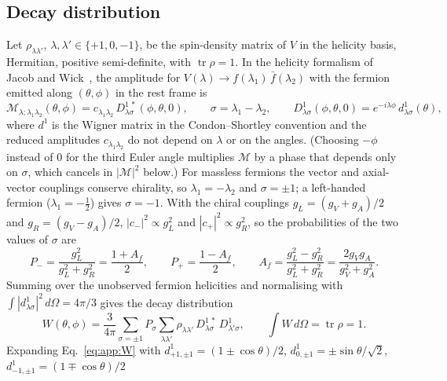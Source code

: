 \subsection{Decay distribution}
\label{app:truth:decay}
Let $\rho_{\lambda\lambda'}$, $\lambda,\lambda' \in \{+1, 0, -1\}$, be the spin-density matrix of $V$ in the helicity
basis, Hermitian, positive semi-definite, with $\operatorname{tr}\rho = 1$. In the helicity formalism of Jacob and
Wick~\cite{Jacob:1959at}, the amplitude for $V(\lambda) \to f(\lambda_1)\,\bar f(\lambda_2)$ with the fermion emitted
along $(\theta,\phi)$ in the rest frame is
\begin{equation}
  \mathcal{M}_{\lambda;\lambda_1\lambda_2}(\theta,\phi) = c_{\lambda_1\lambda_2}\, D^{1\,*}_{\lambda\sigma}(\phi,\theta,0),
  \qquad \sigma = \lambda_1 - \lambda_2,
  \qquad D^{1}_{\lambda\sigma}(\phi,\theta,0) = e^{-i\lambda\phi}\, d^{1}_{\lambda\sigma}(\theta),
  \label{eq:app:amp}
\end{equation}
where $d^1$ is the Wigner matrix in the Condon--Shortley convention and the reduced amplitudes $c_{\lambda_1\lambda_2}$
do not depend on $\lambda$ or on the angles. (Choosing $-\phi$ instead of $0$ for the third Euler angle multiplies
$\mathcal M$ by a phase that depends only on $\sigma$, which cancels in $|\mathcal M|^2$ below.) For massless fermions
the vector and axial-vector couplings conserve chirality, so $\lambda_1 = -\lambda_2$ and $\sigma = \pm1$; a
left-handed fermion ($\lambda_1 = -\tfrac12$) gives $\sigma = -1$. With the chiral couplings
$g_L = (g_V + g_A)/2$ and $g_R = (g_V - g_A)/2$, $|c_{-}|^2 \propto g_L^2$ and $|c_{+}|^2 \propto g_R^2$, so the
probabilities of the two values of $\sigma$ are
\begin{equation}
  P_{-} = \frac{g_L^2}{g_L^2 + g_R^2} = \frac{1 + A_f}{2}, \qquad P_{+} = \frac{1 - A_f}{2}, \qquad
  A_f = \frac{g_L^2 - g_R^2}{g_L^2 + g_R^2} = \frac{2 g_V g_A}{g_V^2 + g_A^2}.
  \label{eq:app:Af}
\end{equation}
Summing over the unobserved fermion helicities and normalising with $\int |d^1_{\lambda\sigma}|^2 \,d\Omega = 4\pi/3$
gives the decay distribution
\begin{equation}
  W(\theta,\phi) = \frac{3}{4\pi}\sum_{\sigma=\pm1} P_\sigma \sum_{\lambda\lambda'} \rho_{\lambda\lambda'}\,
  D^{1\,*}_{\lambda\sigma}\, D^{1}_{\lambda'\sigma}, \qquad \int W\, d\Omega = \operatorname{tr}\rho = 1.
  \label{eq:app:W}
\end{equation}
Expanding Eq.~\eqref{eq:app:W} with
$d^1_{+1,\pm1} = (1\pm\cos\theta)/2$, $d^1_{0,\pm1} = \pm\sin\theta/\sqrt2$, $d^1_{-1,\pm1} = (1\mp\cos\theta)/2$
